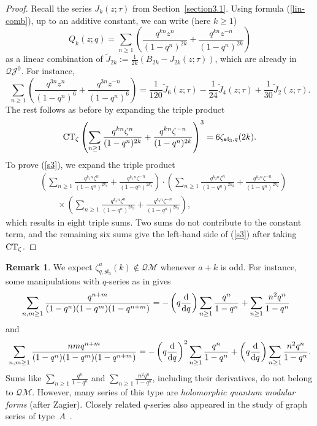 \documentclass[pdftex]{sigma}
\numberwithin{equation}{section}
\theoremstyle{definition}
\newtheorem{Remark}[Theorem]{Remark}
\begin{document}
\begin{proof}
Recall the series $J_k(z;\tau)$ from Section~\ref{section3.1}.
Using formula (\ref{lin-comb}), up to an additive constant, we can write (here $k \geq 1$)
\[
Q_k(z;q)=\sum_{n \geq 1} \left( \frac{q^{kn}z^{n}}{(1-q^n)^{2k}}+ \frac{q^{kn}z^{-n}}{(1-q^n)^{2k}} \right)
\]
as a linear combination of $\tilde{J}_{2k}:=\frac{1}{2k}(B_{2k}-J_{2k}(z;\tau))$, which are already in $\mathcal{QJ}^0$. For instance,
\[
\sum_{n \geq 1} \left( \frac{q^{3n}z^{n}}{(1-q^n)^{6}}+ \frac{q^{3n}z^{-n}}{(1-q^n)^{6}} \right)=\frac{1}{120} \tilde{J}_6(z;\tau)-\frac{1}{24} \tilde{J}_4(z;\tau)+\frac{1}{30} \tilde{J}_2(z;\tau).
\]
The rest follows as before by expanding the triple product
\[
{\rm CT}_\zeta \left(\sum_{n \geq 1} \frac{q^{kn}\zeta^{n}}{(1-q^n)^{2k}}+ \frac{q^{kn}\zeta^{-n}}{(1-q^n)^{2k}} \right)^3=6 \zeta_{\mathfrak{sl}_3,q}(2k).
\]
To prove (\ref{s3}), we expand the triple product
\begin{align*}
& \left(\sum_{n \geq 1} \frac{q^{k_1n}\zeta^{n}}{(1-q^n)^{2k_1}}+ \frac{q^{k_1n}\zeta^{-n}}{(1-q^n)^{2k_1}} \right)\cdot \left(\sum_{n \geq 1} \frac{q^{k_2n}\zeta^{n}}{(1-q^n)^{2k_2}}+ \frac{q^{k_2n}\zeta^{-n}}{(1-q^n)^{2k_2}} \right)\\
& \qquad \times \left(\sum_{n \geq 1} \frac{q^{k_3n}\zeta^{n}}{(1-q^n)^{2k_3}}+ \frac{q^{k_3n}\zeta^{-n}}{(1-q^n)^{2k_3}} \right),
\end{align*}
which results in eight triple sums. Two sums do not contribute to the constant term, and the remaining six sums give the left-hand side of (\ref{s3}) after taking ${\rm CT}_\zeta$.
\end{proof}

\begin{Remark} We expect $\zeta_{q,\mathfrak{sl}_3}^a(k) \notin \mathcal{QM}$ whenever $a+k$ is odd. For instance, some
manipulations with $q$-series as in \cite{Andrews} gives
\begin{align*}
& \sum_{n,m \geq 1} \frac{q^{n+m}}{(1-q^n)(1-q^m)(1-q^{n+m})}
= -\left(q \frac{{\rm d}}{{\rm d}q}\right) \sum_{n \geq 1} \frac{q^n}{1-q^n}+\sum_{n \geq 1} \frac{n^2 q^n}{1-q^n}
\end{align*}
and
\[
\sum_{n,m \geq 1} \frac{n m q^{n+m}}{(1-q^n)(1-q^m)(1-q^{n+m})}=-\left(q \frac{{\rm d}}{{\rm d}q}\right)^2 \sum_{n \geq 1} \frac{q^n}{1-q^n}+\left(q \frac{{\rm d}}{{\rm d}q}\right) \sum_{n \geq 1} \frac{n^2 q^n}{1-q^n}.
\]
Sums like $\sum_{n \geq 1} \frac{q^n}{1-q^n}$ and $\sum_{n \geq 1} \frac{n^2 q^n}{1-q^n}$, including their derivatives, do not belong to $\mathcal{QM}$.
However, many series of this type are {\em holomorphic quantum modular forms} (after Zagier). Closely related $q$-series also appeared in the study of graph series of type~$A$~\cite{BJM}.
\end{Remark}
\end{document}
